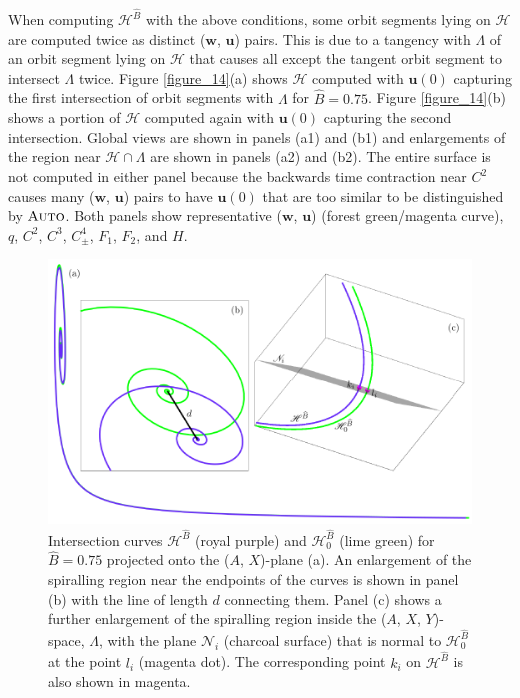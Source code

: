 \documentclass{ws-ijbc}
\begin{document}
When computing $\mathscr{H}^{\widehat{B}}$ with the above conditions, some orbit segments lying on $\mathscr{H}$ are computed twice as distinct ($\mathbf{w}$, $\mathbf{u}$) pairs.  This is due to a tangency with $\Lambda$ of an orbit segment lying on $\mathscr{H}$ that causes all except the tangent orbit segment to intersect $\Lambda$ twice.  Figure \ref{figure_14}(a) shows $\mathscr{H}$ computed with $\mathbf{u}(0)$ capturing the first intersection of orbit segments with $\Lambda$ for $\widehat{B}=0.75$.  Figure \ref{figure_14}(b) shows a portion of $\mathscr{H}$ computed again with $\mathbf{u}(0)$ capturing the second intersection.  Global views are shown in panels (a1) and (b1) and enlargements of the region near $\mathscr{H} \cap \Lambda$ are shown in panels (a2) and (b2).  The entire surface is not computed in either panel because the backwards time contraction near $C^2$ causes many ($\mathbf{w}$, $\mathbf{u}$) pairs to have $\mathbf{u}(0)$ that are too similar to be distinguished by $\textsc{Auto}$.  Both panels show representative ($\mathbf{w}$, $\mathbf{u}$) (forest green/magenta curve), $q$, $C^2$, $C^3$, $C^4_\pm$, $F_1$, $F_2$, and $H$.

\begin{figure}[H]
\centering
\includegraphics[]{./figures/MKMO_15.pdf}
\caption{Intersection curves $\mathscr{H}^{\widehat{B}}$ (royal purple) and $\mathscr{H}_0^{\widehat{B}}$ (lime green) for $\widehat{B}=0.75$ projected onto the ($A$, $X$)-plane (a).  An enlargement of the spiralling region near the endpoints of the curves is shown in panel (b) with the line of length $d$ connecting them.  Panel (c) shows a further enlargement of the spiralling region inside the ($A$, $X$, $Y$)-space, $\Lambda$, with the plane $\mathscr{N}_i$ (charcoal surface) that is normal to $\mathscr{H}_0^{\widehat{B}}$ at the point $l_i$ (magenta dot).  The corresponding point $k_i$ on $\mathscr{H}^{\widehat{B}}$ is also shown in magenta.}
\label{figure_15}
\end{figure}
\end{document}
